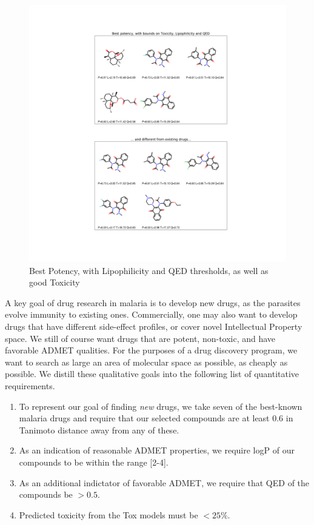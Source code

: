 \documentclass{article}
\begin{document}
\begin{figure}[h!]
\centering
\includegraphics[width=\textwidth]{fig7.png}
\caption{Best Potency, with Lipophilicity and QED thresholds, as well as good Toxicity}
\label{fig:best_q}
\end{figure}


A key goal of drug research in malaria is to develop new drugs, as the parasites evolve immunity to existing ones.  Commercially, one may also want to develop drugs that have different side-effect profiles, or cover novel Intellectual Property space.  We still of course want drugs that are potent, non-toxic, and have favorable ADMET qualities.  For the purposes of a drug discovery program, we want to search as large an area of molecular space as possible, as cheaply as possible.  We distill these qualitative goals into the following list of quantitative requirements. 

\begin{enumerate}
    \item To represent our goal of finding \textit{new} drugs, we take seven of the best-known malaria drugs and require that our selected compounds are at least 0.6 in Tanimoto distance away from any of these.
    \item As an indication of reasonable ADMET properties, we require logP of our compounds to be within the range [2-4]\cite{Hansch1971}.
    \item As an additional indictator of favorable ADMET, we require that QED of the compounds be $> 0.5$.
    \item Predicted toxicity from the Tox models must be $< 25\%$.
\end{enumerate}
\end{document}
